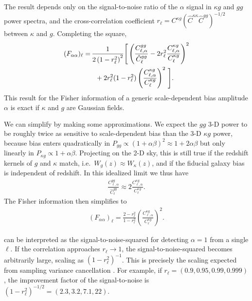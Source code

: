 \documentclass[prd,superscriptaddress,floatfix,notitlepage,nofootinbib,reprint]{revtex4-1} %
\begin{document}
The result depends only on the signal-to-noise ratio of the $\alpha$ signal in $\kappa g$ and $gg$ power spectra, and the cross-correlation coefficient $r_\ell=C^{\kappa g}(\hat C^{\kappa\kappa}\hat C^{gg})^{-1/2}$ between $\kappa$ and $g$.
Completing the square,
\begin{align}
  \label{eq:FisherAlphaFinal2}
    (F_{\alpha\alpha})_\ell =\, & \frac{1}{2\left(1-r_\ell^2\right)^2}\Bigg[ 
\left(\frac{C^{gg}_{\ell,\alpha}}{\hat C^{gg}_\ell}-2r^2_\ell\frac{C^{\kappa g}_{\ell,\alpha}}{C^{\kappa g}_\ell}\right)^2\nonumber\\
&\;\; +2r_\ell^2(1-r_\ell^2)\left(\frac{C^{\kappa g}_{\ell,\alpha}}{C^{\kappa g}_\ell}\right)^2
\,\Bigg].
\end{align}
This result for the Fisher information of a generic scale-dependent bias amplitude $\alpha$ is exact if $\kappa$ and $g$ are Gaussian fields.


We can simplify  by making some approximations.
We expect the $gg$ 3-D power to be roughly twice as sensitive to scale-dependent bias than the 3-D $\kappa g$ power, because bias enters quadratically in $P_{gg}\propto (1+\alpha\beta)^2\approx 1+2\alpha\beta$ but only linearly in $P_{\kappa g}\propto 1+\alpha\beta$.
Projecting on the 2-D sky, this is still true if the redshift kernels of $g$ and $\kappa$ match, i.e.~$W_g(z)\approx W_\kappa(z)$, and if the fiducial galaxy bias is independent of redshift.
In this idealized limit we thus have
\begin{align}
  \label{eq:DerivApprox}
  \frac{C^{gg}_{\ell,\alpha}}{\hat C^{gg}_\ell} \approx 2 \frac{C^{\kappa g}_{\ell,\alpha}}{C^{\kappa g}_\ell}.
\end{align}
The Fisher information then simplifies to
\begin{align}
  \label{eq:FalphalphaRCC}
  (F_{\alpha\alpha})_\ell = \frac{2-r_\ell^2}{1-r_\ell^2} \left(\frac{C^{\kappa g}_{\ell,\alpha}}{C^{\kappa g}_\ell}\right)^2.
\end{align}


 can be interpreted as the signal-to-noise-squared for detecting $\alpha=1$ from a single $\ell$. 
If the correlation approaches $r_\ell\rightarrow 1$, the signal-to-noise-squared becomes arbitrarily large, scaling as $(1-r_\ell^2)^{-1}$.
This is precisely the scaling expected from sampling variance cancellation \cite{Uros0807,McDonaldSeljak0810}.
For example, if $r_\ell=(0.9,0.95,0.99,0.999)$, the improvement factor of the signal-to-noise is $(1-r_\ell^2)^{-1/2}=(2.3, 3.2, 7.1, 22)$.
\end{document}
